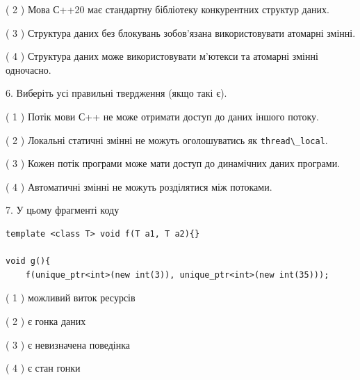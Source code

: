 \documentclass[12pt, ukrainian]{article}
\def\code#1{\Verb!#1!}
\begin{document}
\begin {large}
{( 2 ) Мова С++20 має стандартну бібліотеку конкурентних структур даних.%

( 3 ) Структура даних без блокувань зобов’язана використовувати атомарні змінні.%

( 4 ) Структура даних може використовувати м’ютекси та атомарні змінні одночасно.%
\newpage



\vspace{5mm}
6. Виберіть усі правильні твердження (якщо такі є).\par
\vspace{2mm}

( 1 ) Потік мови С++ не може отримати доступ до даних іншого потоку.%

( 2 ) Локальні статичні змінні не можуть оголошуватись як \code{thread\_local}.%

( 3 ) Кожен потік програми може мати доступ до динамічних даних програми.%

( 4 ) Автоматичні змінні не можуть розділятися між потоками.%


\vspace{5mm}
7. У цьому фрагменті коду
\begin{verbatim}
template <class T> void f(T a1, T a2){}

void g(){
    f(unique_ptr<int>(new int(3)), unique_ptr<int>(new int(35)));
\end{verbatim}

( 1 ) можливий виток ресурсів%

( 2 ) є гонка даних%

( 3 ) є невизначена поведінка%

( 4 ) є стан гонки%
}
\end {large}
\end{document}
